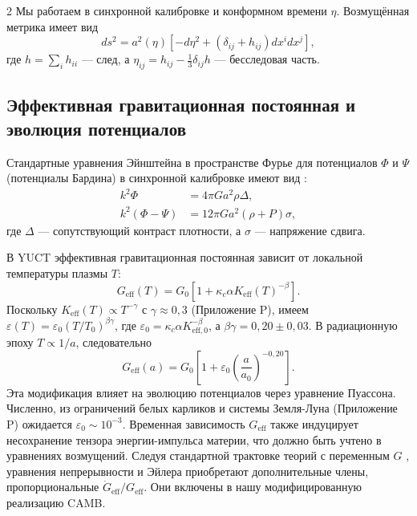 \documentclass[11pt,a4paper]{article}
\begin{document}
\begin{multicols}{2}
		Мы работаем в синхронной калибровке и конформном времени $\eta$. Возмущённая метрика имеет вид
		\begin{equation}
			ds^2 = a^2(\eta)\left[ -d\eta^2 + (\delta_{ij} + h_{ij}) dx^i dx^j \right],
		\end{equation}
		где $h = \sum_i h_{ii}$ — след, а $\eta_{ij} = h_{ij} - \frac{1}{3}\delta_{ij}h$ — бесследовая часть.
		
		\subsection{Эффективная гравитационная постоянная и эволюция потенциалов}
		
		Стандартные уравнения Эйнштейна в пространстве Фурье для потенциалов $\Phi$ и $\Psi$ (потенциалы Бардина) в синхронной калибровке имеют вид \cite{Ma1995}:
		\begin{align}
			k^2 \Phi &= 4\pi G a^2 \rho \Delta, \\
			k^2 (\Phi - \Psi) &= 12\pi G a^2 (\rho+P) \sigma,
		\end{align}
		где $\Delta$ — сопутствующий контраст плотности, а $\sigma$ — напряжение сдвига.
		
		В YUCT эффективная гравитационная постоянная зависит от локальной температуры плазмы $T$:
		\begin{equation}
			G_{\mathrm{eff}}(T) = G_0\left[1 + \kappa_c \alpha K_{\mathrm{eff}}(T)^{-\beta}\right].
			\label{eq:Geff}
		\end{equation}
		Поскольку $K_{\mathrm{eff}}(T) \propto T^{-\gamma}$ с $\gamma \approx 0,3$ (Приложение P), имеем $\varepsilon(T) = \varepsilon_0 (T/T_0)^{\beta\gamma}$, где $\varepsilon_0 = \kappa_c \alpha K_{\mathrm{eff},0}^{-\beta}$, а $\beta\gamma = 0,20 \pm 0,03$. В радиационную эпоху $T \propto 1/a$, следовательно
		\begin{equation}
			G_{\mathrm{eff}}(a) = G_0\left[1 + \varepsilon_0 \left(\frac{a}{a_0}\right)^{-0,20}\right].
			\label{eq:Geff_a}
		\end{equation}
		Эта модификация влияет на эволюцию потенциалов через уравнение Пуассона. Численно, из ограничений белых карликов и системы Земля-Луна (Приложение P) ожидается $\varepsilon_0 \sim 10^{-3}$. Временная зависимость $G_{\mathrm{eff}}$ также индуцирует несохранение тензора энергии-импульса материи, что должно быть учтено в уравнениях возмущений. Следуя стандартной трактовке теорий с переменным $G$ \cite{Uzan2011}, уравнения непрерывности и Эйлера приобретают дополнительные члены, пропорциональные $\dot{G}_{\mathrm{eff}}/G_{\mathrm{eff}}$. Они включены в нашу модифицированную реализацию CAMB.
		

\end{multicols}
\end{document}
